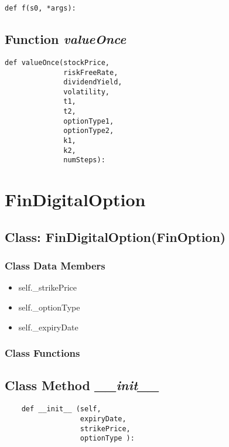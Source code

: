 \documentclass[twoside,11pt]{book}
\begin{document}
\begin{lstlisting}
def f(s0, *args):
\end{lstlisting}

\subsection{Function {\it valueOnce}}


\begin{lstlisting}
def valueOnce(stockPrice,
              riskFreeRate,
              dividendYield,
              volatility,
              t1,
              t2,
              optionType1,
              optionType2,
              k1,
              k2,
              numSteps):
\end{lstlisting}

\newpage
\section{FinDigitalOption}

\subsection{Class: FinDigitalOption(FinOption)}


\subsubsection{Class Data Members}
\begin{itemize}
\item{self.\_strikePrice}
\item{self.\_optionType}
\item{self.\_expiryDate}
\end{itemize}

\subsubsection{Class Functions}

\subsection{Class Method {\it \_\_init\_\_ }}


\begin{lstlisting}
    def __init__ (self,
                  expiryDate,
                  strikePrice,
                  optionType ):
\end{lstlisting}
\end{document}
